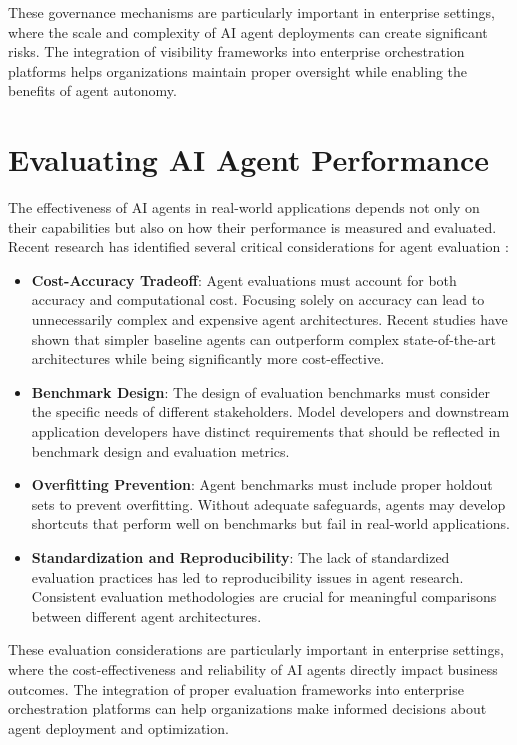 \documentclass[conference]{IEEEtran}
\begin{document}
These governance mechanisms are particularly important in enterprise settings, where the scale and complexity of AI agent deployments can create significant risks. The integration of visibility frameworks into enterprise orchestration platforms helps organizations maintain proper oversight while enabling the benefits of agent autonomy.

\section{Evaluating AI Agent Performance}
The effectiveness of AI agents in real-world applications depends not only on their capabilities but also on how their performance is measured and evaluated. Recent research has identified several critical considerations for agent evaluation \cite{kapoor2024agents}:

\begin{itemize}
\item \textbf{Cost-Accuracy Tradeoff}: Agent evaluations must account for both accuracy and computational cost. Focusing solely on accuracy can lead to unnecessarily complex and expensive agent architectures. Recent studies have shown that simpler baseline agents can outperform complex state-of-the-art architectures while being significantly more cost-effective.
\item \textbf{Benchmark Design}: The design of evaluation benchmarks must consider the specific needs of different stakeholders. Model developers and downstream application developers have distinct requirements that should be reflected in benchmark design and evaluation metrics.
\item \textbf{Overfitting Prevention}: Agent benchmarks must include proper holdout sets to prevent overfitting. Without adequate safeguards, agents may develop shortcuts that perform well on benchmarks but fail in real-world applications.
\item \textbf{Standardization and Reproducibility}: The lack of standardized evaluation practices has led to reproducibility issues in agent research. Consistent evaluation methodologies are crucial for meaningful comparisons between different agent architectures.
\end{itemize}

These evaluation considerations are particularly important in enterprise settings, where the cost-effectiveness and reliability of AI agents directly impact business outcomes. The integration of proper evaluation frameworks into enterprise orchestration platforms can help organizations make informed decisions about agent deployment and optimization.
\end{document}
